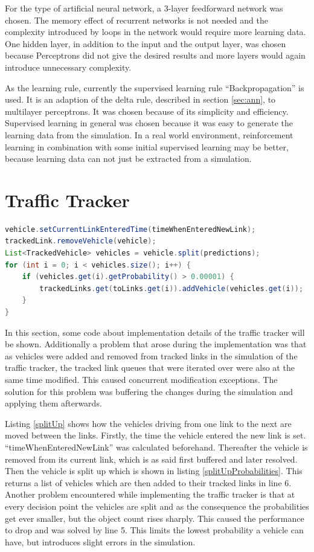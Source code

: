 For the type of artificial neural network, a 3-layer feedforward network was chosen. The memory effect of recurrent networks is not needed and the complexity introduced by loops in the network would require more learning data. One hidden layer, in addition to the input and the output layer, was chosen because Perceptrons did not give the desired results and more layers would again introduce unnecessary complexity.

As the learning rule, currently the supervised learning rule ``Backpropagation'' is used. It is an adaption of the delta rule, described in section \ref{sec:ann}, to multilayer perceptrons. It was chosen because of its simplicity and efficiency. Supervised learning in general was chosen because it was easy to generate the learning data from the simulation. In a real world environment, reinforcement learning in combination with some initial supervised learning may be better, because learning data can not just be extracted from a simulation.

\section{Traffic Tracker}

\vspace{0.5em}

\begin{lstlisting}[caption={Split Up Vehicle to Multiple Links}, label=splitUp, language=Java]
vehicle.setCurrentLinkEnteredTime(timeWhenEnteredNewLink);
trackedLink.removeVehicle(vehicle);
List<TrackedVehicle> vehicles = vehicle.split(predictions);
for (int i = 0; i < vehicles.size(); i++) {
	if (vehicles.get(i).getProbability() > 0.00001) {
		trackedLinks.get(toLinks.get(i)).addVehicle(vehicles.get(i));
	}
}
\end{lstlisting}

In this section, some code about implementation details of the traffic tracker will be shown. Additionally a problem that arose during the implementation was that as vehicles were added and removed from tracked links in the simulation of the traffic tracker, the tracked link queues that were iterated over were also at the same time modified. This caused concurrent modification exceptions. The solution for this problem was buffering the changes during the simulation and applying them afterwards.

Listing \ref{splitUp} shows how the vehicles driving from one link to the next are moved between the links. Firstly, the time the vehicle entered the new link is set. ``timeWhenEnteredNewLink'' was calculated beforehand. Thereafter the vehicle is removed from its current link, which is as said first buffered and later resolved. Then the vehicle is split up which is shown in listing \ref{splitUpProbabilities}. This returns a list of vehicles which are then added to their tracked links in line 6. Another problem encountered while implementing the traffic tracker is that at every decision point the vehicles are split and as the consequence the probabilities get ever smaller, but the object count rises sharply. This caused the performance to drop and was solved by line 5. This limits the lowest probability a vehicle can have, but introduces slight errors in the simulation.

